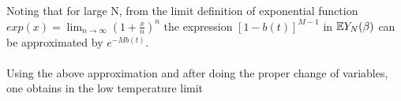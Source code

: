 \documentclass[letterpaper,english,10pt]{article}
\begin{document}
Noting that for large N, from the limit definition of exponential function $exp(x) = \lim_{n \to \infty}(1 + \frac{x}{n})^n$ the expression $[1 - b(t)]^{M-1} $ in $\mathbb{E} Y_N(\beta)$ can be approximated by $e^{-Mb(t)}$.\\
\\
Using the above approximation and after doing the proper change of variables, one obtains in the low temperature limit
\end{document}
